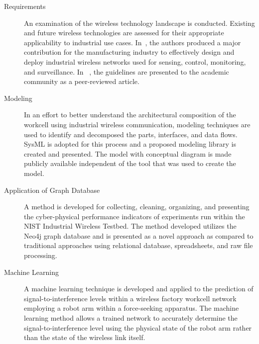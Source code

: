 		\begin{description}
	
	\item[Requirements] \cite{CandellRW2017} \cite{Montgomery2019} \cite{Candell2018.IWSGuide} \cite{ieeeMagazine2018} An examination of the wireless technology landscape is conducted.  Existing and future wireless technologies are assessed for their appropriate applicability to industrial use cases. In~\cite{Candell2018.IWSGuide}, the authors produced a major contribution for the manufacturing industry to effectively design and deploy industrial wireless networks used for sensing, control, monitoring, and surveillance.  In ~\cite{ieeeMagazine2018}, the guidelines are presented to the academic community as a peer-reviewed article.
	
	\item[Modeling] \cite{Candell2019ASR.SYSML} \cite{Candell2018SysML.JRES} In an effort to better understand the architectural composition of the workcell using industrial wireless communication, modeling techniques are used to identify and decomposed the parts, interfaces, and data flows.  SysML is adopted for this process and a proposed modeling library is created and presented.  The model with conceptual diagram is made publicly available independent of the tool that was used to create the model.
	
	\item[Application of Graph Database] \cite{CandellISIT2020.Conf} A method is developed for collecting, cleaning, organizing, and presenting the cyber-physical performance indicators of experiments run within the NIST Industrial Wireless Testbed. The method developed utilizes the Neo4j graph database and is presented as a novel approach as compared to traditional approaches using relational database, spreadsheets, and raw file processing.
	
	\item[Machine Learning] \cite{CandellISIE2019.Conf} \cite{Candell2020.Jrnl.Access} A machine learning technique is developed and applied to the prediction of signal-to-interference levels within a wireless factory workcell network employing a robot arm within a force-seeking apparatus.  The machine learning method allows a trained network to accurately determine the signal-to-interference level using the physical state of the robot arm rather than the state of the wireless link itself.
	
\end{description}


